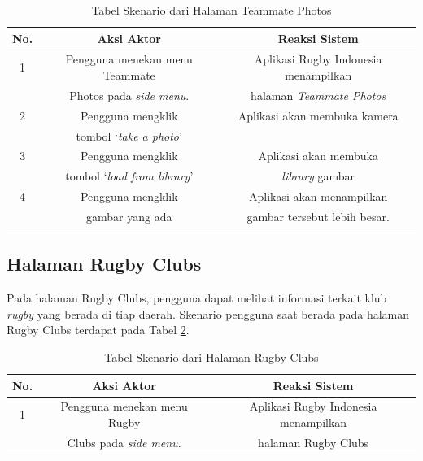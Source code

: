 \begin{table} [!h]
    \centering
    \caption{Tabel Skenario dari Halaman Teammate Photos}
    \begin{tabular}{|c|c|c|}
    \hline
       No. & Aksi Aktor & Reaksi Sistem  \\ \hline
        1 & Pengguna menekan menu Teammate & Aplikasi Rugby Indonesia menampilkan \\
         &  Photos pada \textit{side menu}. & halaman \textit{Teammate Photos} \\ \hline
        2 & Pengguna mengklik & Aplikasi akan membuka kamera \\ 
         & tombol `\textit{take a photo}' &  \\ \hline
        3 & Pengguna mengklik & Aplikasi akan membuka  \\ 
         & tombol `\textit{load from library}' & \textit{library} gambar  \\ \hline
        4 & Pengguna mengklik & Aplikasi akan menampilkan \\
          & gambar yang ada & gambar tersebut lebih besar. \\ \hline
    \end{tabular}
    \label{tab:existing-scenario-teammate-photos-page}
\end{table}

\subsection{Halaman Rugby Clubs}
Pada halaman Rugby Clubs, pengguna dapat melihat informasi terkait klub \textit{rugby} yang berada di tiap daerah. Skenario pengguna saat berada pada halaman Rugby Clubs terdapat pada Tabel \ref{tab:existing-scenario-rugby-clubs-page}.

\begin{table} [H]
    \centering
    \caption{Tabel Skenario dari Halaman Rugby Clubs}
    \begin{tabular}{|c|c|c|}
    \hline
       No. & Aksi Aktor & Reaksi Sistem  \\ \hline
        1 & Pengguna menekan menu Rugby & Aplikasi Rugby Indonesia menampilkan \\
         &  Clubs pada \textit{side menu}. & halaman Rugby Clubs \\ \hline
    \end{tabular}
    \label{tab:existing-scenario-rugby-clubs-page}
\end{table}

